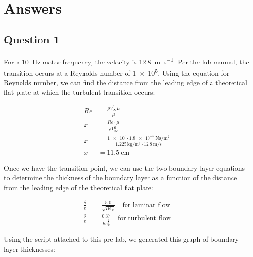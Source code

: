 \chapter{Answers}
\label{cp:answers}
\section{Question 1}

For a \qty{10}{\hertz} motor frequency, the velocity is \qty{12.8}{\meter\per\second}. Per the lab manual, the transition occurs at a Reynolds number of \num{1e5}. Using the equation for Reynolds number, we can find the distance from the leading edge of a theoretical flat plate at which the turbulent transition occurs:

\begin{align}
    Re &= \frac{\rho V_\infty^2 L}{\mu} \\
    x &= \frac{Re\cdot\mu}{\rho V_\infty^2} \nonumber \\
    x &= \frac{\num{1e5}\cdot\qty{1.8e-5}{\newton\second\per\meter\squared}}{\qty{1.225}{\kilo\gram\per\meter\cubed}\cdot\qty{12.8}{\meter\per\second}} \nonumber \\
    x &= \qty{11.5}{\centi\meter} \nonumber
\end{align}

Once we have the transition point, we can use the two boundary layer equations to determine the thickness of the boundary layer as a function of the distance from the leading edge of the theoretical flat plate:

\begin{align}
    \frac{\delta}{x} &= \frac{5.0}{\sqrt{Re_x}}\quad\text{for laminar flow} \\
    \frac{\delta}{x} &= \frac{0.37}{Re_x^{\frac{1}{5}}}\quad\text{for turbulent flow}
\end{align}

Using the script attached to this pre-lab, we generated this graph of boundary layer thicknesses:






